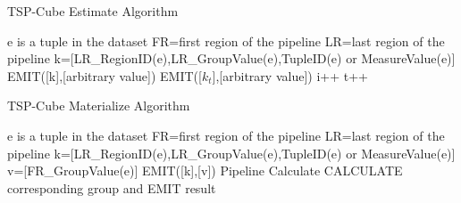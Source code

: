 {\renewcommand\baselinestretch{1} 
\begin{algorithm}
\caption{TSP-Cube Estimate Algorithm}
\label{tscube_mr1}
{\fontfamily{\familydefault}\selectfont

	\begin{algorithmic}[1] %
    	\State e is a tuple in the dataset
    		\State FR=first region of the pipeline
    		\State LR=last region of the pipeline
        	\State k=[LR\_RegionID(e),LR\_GroupValue(e),TupleID(e) or MeasureValue(e)]
        	\State EMIT([k],[arbitrary value])
        \EndFor
   	 \EndFunction
   	 \State
     		 \State	
     		 EMIT([${k}_{t}$],[arbitrary value]) 
     		 \State i++
     		\EndIf
     		\State t++
     	\EndWhile
     \EndFunction
	\end{algorithmic}	
}
\end{algorithm}



\begin{algorithm}[t]
\caption{TSP-Cube Materialize Algorithm}
\label{tscube_mr2}
{\fontfamily{\familydefault}\selectfont

	\begin{algorithmic}[1] %
    	\State e is a tuple in the dataset
    		\State FR=first region of the pipeline
    		\State LR=last region of the pipeline
        	\State k=[LR\_RegionID(e),LR\_GroupValue(e),TupleID(e) or MeasureValue(e)]
        	\State v=[FR\_GroupValue(e)]
        	\State EMIT([k],[v])
        \EndFor
   	 \EndFunction
   	 \State
     	\State Pipeline Calculate 
     			\State
     			CALCULATE corresponding group and EMIT result
     		\EndIf
     	\EndFor
     \EndFunction
	\end{algorithmic}	
}
\end{algorithm}





\par}









